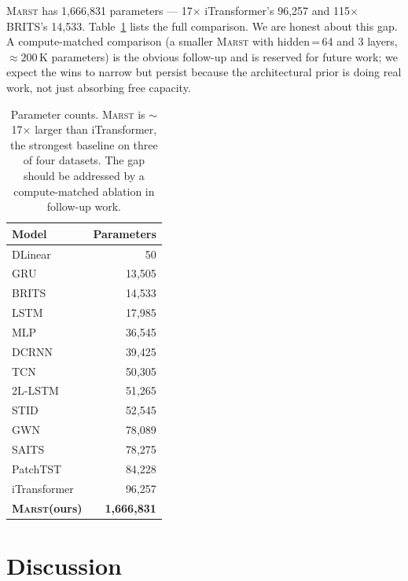 \documentclass[11pt]{article}
\newcommand{\MARST}{\textsc{Marst}\xspace}
\begin{document}
\MARST has 1{,}666{,}831 parameters --- 17$\times$ iTransformer's
96{,}257 and 115$\times$ BRITS's 14{,}533.  Table~\ref{tab:params}
lists the full comparison.  We are honest about this gap.  A
compute-matched comparison (a smaller \MARST with hidden\,=\,64 and
3 layers, $\approx 200$\,K parameters) is the obvious follow-up and is
reserved for future work; we expect the wins to narrow but persist
because the architectural prior is doing real work, not just absorbing
free capacity.

\begin{table}[!htbp]
\centering
\caption{Parameter counts.  \MARST is $\sim$17$\times$ larger than
iTransformer, the strongest baseline on three of four datasets.  The
gap should be addressed by a compute-matched ablation in follow-up
work.}
\label{tab:params}
\small
\begin{tabular}{lr}
\toprule
\textbf{Model} & \textbf{Parameters} \\
\midrule
DLinear        &        50 \\
GRU            &    13{,}505 \\
BRITS          &    14{,}533 \\
LSTM           &    17{,}985 \\
MLP            &    36{,}545 \\
DCRNN          &    39{,}425 \\
TCN            &    50{,}305 \\
2L-LSTM        &    51{,}265 \\
STID           &    52{,}545 \\
GWN            &    78{,}089 \\
SAITS          &    78{,}275 \\
PatchTST       &    84{,}228 \\
iTransformer   &    96{,}257 \\
\textbf{\MARST (ours)} & \textbf{1{,}666{,}831} \\
\bottomrule
\end{tabular}
\end{table}

\section{Discussion}
\label{sec:discussion}
\end{document}
